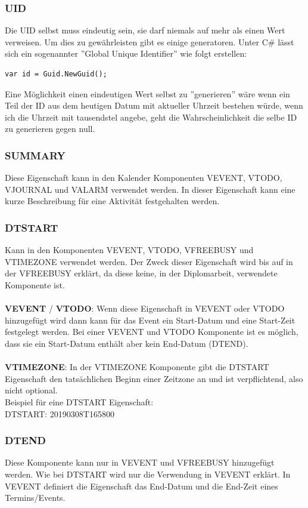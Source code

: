 \subsubsection{UID}
\label{sec:uid}
Die UID selbst muss eindeutig sein, sie darf niemals auf mehr als einen Wert verweisen. Um dies zu gewährleisten gibt es einige generatoren. Unter C\# lässt sich ein sogenannter ''Global Unique Identifier'' wie folgt erstellen: \\
\begin{lstlisting}[caption=GUID in C\#, label=lst:test]
var id = Guid.NewGuid(); 
\end{lstlisting}
Eine Möglichkeit einen eindeutigen Wert selbst zu ''generieren'' wäre wenn ein Teil der ID aus dem heutigen Datum mit aktueller Uhrzeit bestehen würde, wenn ich die Uhrzeit mit tausendstel angebe, geht die Wahrscheinlichkeit die selbe ID zu generieren gegen null.
\subsubsection{SUMMARY}
\label{sec:summary}
Diese Eigenschaft kann in den Kalender Komponenten VEVENT, VTODO, VJOURNAL und VALARM verwendet werden. In dieser Eigenschaft kann eine kurze Beschreibung für eine Aktivität festgehalten werden.
\subsubsection{DTSTART}
\label{sec:dtstart}
Kann in den Komponenten VEVENT, VTODO, VFREEBUSY und VTIMEZONE verwendet werden. Der Zweck dieser Eigenschaft wird bis auf in der VFREEBUSY erklärt, da diese keine, in der Diplomarbeit, verwendete Komponente ist. \\ \\ \textbf{VEVENT} / \textbf{VTODO}: Wenn diese Eigenschaft in VEVENT oder VTODO hinzugefügt wird dann kann für das Event ein Start-Datum und eine Start-Zeit festgelegt werden. Bei einer VEVENT und VTODO Komponente ist es möglich, dass sie ein Start-Datum enthält aber kein End-Datum (DTEND). \\ \\ \textbf{VTIMEZONE}: In der VTIMEZONE Komponente gibt die DTSTART Eigenschaft den tatsächlichen Beginn einer Zeitzone an und ist verpflichtend, also nicht optional. \\
Beispiel für eine DTSTART Eigenschaft: \\
DTSTART: 20190308T165800 
\subsubsection{DTEND}
\label{sec:dtend}
Diese Komponente kann nur in VEVENT und VFREEBUSY hinzugefügt werden. Wie bei DTSTART wird nur die Verwendung in VEVENT erklärt. In VEVENT definiert die Eigenschaft das End-Datum und die End-Zeit eines Termins/Events.
